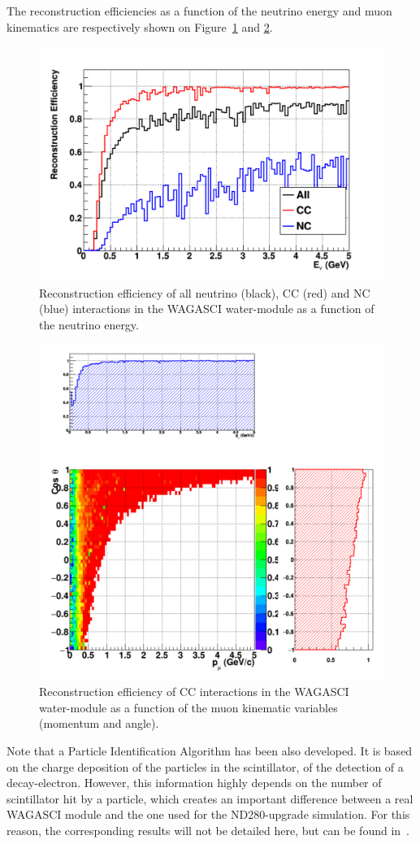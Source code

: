 The reconstruction efficiencies as a function of the neutrino energy and muon kinematics are respectively shown on Figure~\ref{fig:efficiency_enu} and \ref{fig:efficiency_muonkinematics}.
\begin{figure}
  \centering
\includegraphics[width=.7\textwidth]{fig/Efficiency_Enu.pdf}
  \caption{\label{fig:efficiency_enu} Reconstruction efficiency of all neutrino (black), CC (red) and NC (blue) interactions in the WAGASCI water-module as a function of the neutrino energy.}
\end{figure}
\begin{figure}
  \centering
\includegraphics[width=.7\textwidth]{fig/Efficiency_MuonKinematics.pdf}
  \caption{\label{fig:efficiency_muonkinematics} Reconstruction efficiency of CC interactions in the WAGASCI water-module as a function of the muon kinematic variables (momentum and angle).}
\end{figure}
\clearpage

Note that a Particle Identification Algorithm has been also developed. It is based on the charge deposition of the particles in the scintillator, of the detection of a decay-electron. However, this information highly depends on the number of scintillator hit by a particle, which creates an important difference between a real WAGASCI module and the one used for the ND280-upgrade simulation. For this reason, the corresponding results will not be detailed here, but can be found in~\cite{ND280Upgrade}.

